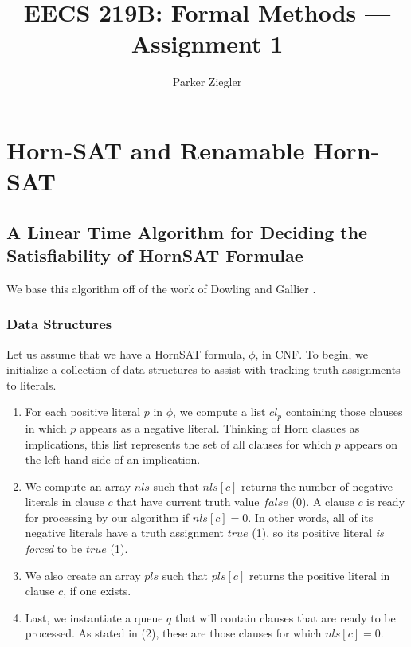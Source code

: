 \documentclass{article}
\title{EECS 219B: Formal Methods — Assignment 1}
\author{Parker Ziegler}
\begin{document}
\maketitle

\section{Horn-SAT and Renamable Horn-SAT}

\bigskip
\subsection{A Linear Time Algorithm for Deciding the Satisfiability of HornSAT Formulae}

\bigskip
\noindent We base this algorithm off of the work of Dowling and Gallier \cite{dowling_1984}.

\subsubsection{Data Structures}

\medskip
\noindent Let us assume that we have a HornSAT formula, $\phi$, in CNF. To begin, we initialize a collection of data structures to assist with tracking truth assignments to literals.

\begin{enumerate}
  \item For each positive literal $p$ in $\phi$, we compute a list $cl_p$ containing those clauses in which $p$ appears as a negative literal. Thinking of Horn clasues as implications, this list represents the set of all clauses for which $p$ appears on the left-hand side of an implication.
  \item We compute an array $nls$ such that $nls[c]$ returns the number of negative literals in clause $c$ that have current truth value $false$ (0). A clause $c$ is ready for processing by our algorithm if $nls[c] = 0$. In other words, all of its negative literals have a truth assignment $true$ (1), so its positive literal \emph{is forced} to be $true$ (1).
  \item We also create an array $pls$ such that $pls[c]$ returns the positive literal in clause $c$, if one exists.
  \item Last, we instantiate a queue $q$ that will contain clauses that are ready to be processed. As stated in (2), these are those clauses for which $nls[c] = 0$.
\end{enumerate}
\end{document}
